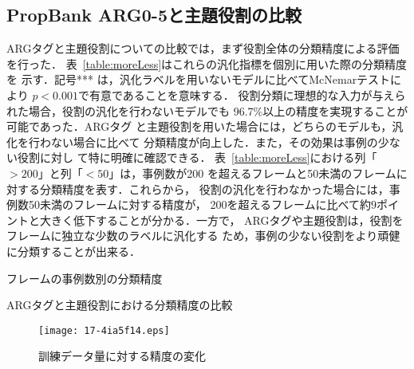 \documentclass[japanese]{jnlp_1.4}
\begin{document}
\subsection{PropBank ARG0-5と主題役割の比較}
\label{sec:pbVsTr}

ARGタグと主題役割についての比較では，まず役割全体の分類精度による評価を行った．
表~\ref{table:moreLess}はこれらの汎化指標を個別に用いた際の分類精度を
示す．記号*** は，汎化ラベルを用いないモデルに比べてMcNemarテストにより
$p < 0.001$で有意であることを意味する．
役割分類に理想的な入力が与えられた場合，役割の汎化を行わないモデルでも
96.7\%以上の精度を実現することが可能であった．ARGタグ
と主題役割を用いた場合には，どちらのモデルも，汎化を行わない場合に比べて
分類精度が向上した．また，その効果は事例の少ない役割に対し
て特に明確に確認できる．
表~\ref{table:moreLess}における列「$>200$」と列「$<50$」は，事例数が200
を超えるフレームと50未満のフレームに対する分類精度を表す．これらから，
役割の汎化を行わなかった場合には，事例数50未満のフレームに対する精度が，
200を超えるフレームに比べて約$9$ポイントと大きく低下することが分かる．一方で，
ARGタグや主題役割は，役割をフレームに独立な少数のラベルに汎化する
ため，事例の少ない役割をより頑健に分類することが出来る．

\begin{table}[b]
\begin{minipage}[t]{163pt}
\caption{フレームの事例数別の分類精度}
\label{table:moreLess} 

\end{minipage}
\hfill
\begin{minipage}[t]{253pt}
\caption{ARGタグと主題役割における分類精度の比較}
\label{table:argF1} 

\end{minipage}
\end{table}

\begin{figure}[b]
\begin{center}
\texttt{[image: 17-4ia5f14.eps]}
\end{center}
 \caption{訓練データ量に対する精度の変化}
\label{fig:reduce} 
\end{figure}
\end{document}
